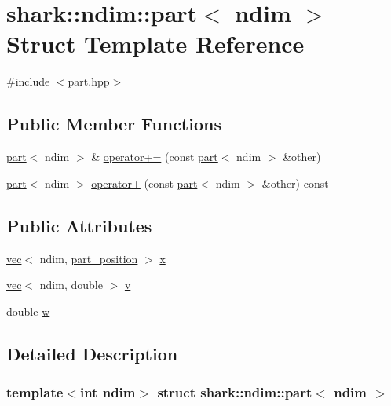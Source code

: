 \hypertarget{structshark_1_1ndim_1_1part}{}\section{shark\+:\+:ndim\+:\+:part$<$ ndim $>$ Struct Template Reference}
\label{structshark_1_1ndim_1_1part}


{\ttfamily \#include $<$part.\+hpp$>$}

\subsection*{Public Member Functions}
\begin{DoxyCompactItemize}
\item 
\hyperlink{structshark_1_1ndim_1_1part}{part}$<$ ndim $>$ \& \hyperlink{structshark_1_1ndim_1_1part_a94f82c7e9b155ada9b231f8bb4ed7d6f}{operator+=} (const \hyperlink{structshark_1_1ndim_1_1part}{part}$<$ ndim $>$ \&other)
\item 
\hyperlink{structshark_1_1ndim_1_1part}{part}$<$ ndim $>$ \hyperlink{structshark_1_1ndim_1_1part_af38c76aff059b4468d7cc3d049f52547}{operator+} (const \hyperlink{structshark_1_1ndim_1_1part}{part}$<$ ndim $>$ \&other) const
\end{DoxyCompactItemize}
\subsection*{Public Attributes}
\begin{DoxyCompactItemize}
\item 
\hyperlink{structshark_1_1ndim_1_1vec}{vec}$<$ ndim, \hyperlink{structshark_1_1ndim_1_1part__position}{part\+\_\+position} $>$ \hyperlink{structshark_1_1ndim_1_1part_a8683feb6fd18c499f11f72dcdd3b7c1a}{x}
\item 
\hyperlink{structshark_1_1ndim_1_1vec}{vec}$<$ ndim, double $>$ \hyperlink{structshark_1_1ndim_1_1part_a985d6b06c78b3d33e080d2610ca4e3da}{v}
\item 
double \hyperlink{structshark_1_1ndim_1_1part_a030c3103f8272c8119666a818b99c513}{w}
\end{DoxyCompactItemize}


\subsection{Detailed Description}
\subsubsection*{template$<$int ndim$>$\newline
struct shark\+::ndim\+::part$<$ ndim $>$}

